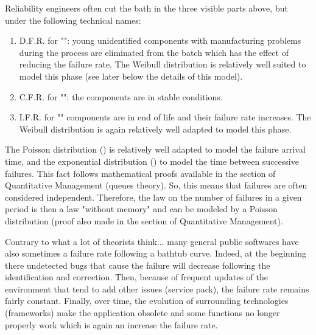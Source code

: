 	Reliability engineers often cut the bath in the three visible parts above, but under the following technical names:
	\begin{enumerate}
		\item D.F.R. for "": young unidentified components with manufacturing problems during the process are eliminated from the batch which has the effect of reducing the failure rate. The Weibull distribution is relatively well suited to model this phase (see later below the details of this model).
		
		\item C.F.R. for "": the components are in stable conditions.
		
		\item I.F.R. for "" components are in end of life and their failure rate increases. The Weibull distribution is again relatively well adapted to model this phase.
	\end{enumerate}
	
	The Poisson distribution () is relatively well adapted to model the failure arrival time, and the exponential distribution () to model the time between successive failures. This fact follows mathematical proofs available in the section of Quantitative Management (queues theory). So, this means that failures are often considered independent. Therefore, the law on the number of failures in a given period is then a law "without memory" and can be modeled by a Poisson distribution (proof also made in the section of Quantitative Management).
	
	\begin{tcolorbox}[title=Remark,colframe=black,arc=10pt]
	Contrary to what a lot of theorists think... many general public softwares have also sometimes a failure rate following a bathtub curve. Indeed, at the beginning there undetected bugs that cause the failure will decrease following the identification and correction. Then, because of frequent updates of the environment that tend to add other issues (service pack), the failure rate remains fairly constant. Finally, over time, the evolution of surrounding technologies (frameworks) make the application obsolete and some functions no longer properly work which is again an increase the failure rate.
	\end{tcolorbox}
	
